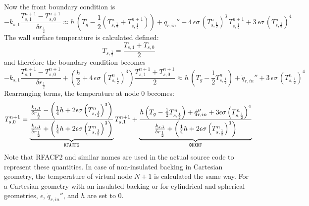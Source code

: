 Now the front boundary condition is
\begin{equation}
\label{bc_front_2}
  -k_{s,1} \frac{T_{s,1}^{n+1}-T_{s,0}^{n+1}}{\delta r_{\frac{1}{2}}}
  \approx h \, \left( T_g - \frac{1}{2} \left( T_{s,\frac{1}{2}}^n+T_{s,\frac{1}{2}}^{n+1} \right) \right) +
  \dot{q}_{r, in}'' - 4 \, \epsilon\sigma \, \left(T_{s,\frac{1}{2}}^n \right)^3 \, T_{s,\frac{1}{2}}^{n+1} + 3 \, \epsilon\sigma \, \left( T_{s,\frac{1}{2}}^n \right)^4
\end{equation}
The wall surface temperature is calculated defined:
\begin{equation}
\label{T_front}
  T_{s,\frac{1}{2}} = \frac{T_{s,1}+T_{s,0}}{2}
\end{equation}
and therefore the boundary condition becomes
\begin{equation}
\label{bc_front_4}
  -k_{s,1} \frac{T_{s,1}^{n+1}-T_{s,0}^{n+1}}{\delta r_{\frac{1}{2}}} + \left( \frac{h}{2} + 4 \, \epsilon\sigma \, \left( T_{s,\frac{1}{2}}^n \right)^3 \right) \frac{T_{s,1}^{n+1}+T_{s,0}^{n+1}}{2}
  \approx h\, \left( T_g - \frac{1}{2}T_{s,\frac{1}{2}}^n \right) +
  \dot{q}_{r, in}'' + 3 \, \epsilon\sigma \, \left( T_{s,\frac{1}{2}}^n \right)^4
\end{equation}
Rearranging terms, the temperature at node 0 becomes:
\begin{equation}
\label{T0}
  T_{s,0}^{n+1} = \underbrace{\frac{\frac{k_{s,1}}{\delta r_{\frac{1}{2}}}- \left(\frac{1}{4}h+2\epsilon \sigma \left(T_{s,\frac{1}{2}}^n\right)^3 \right)}{\frac{k_{s,1}}{\delta r_{\frac{1}{2}}} + \left(\frac{1}{4}h+2\epsilon \sigma \left( T_{s,\frac{1}{2}}^n\right)^3 \right)}}_{\tt\small RFACF2} T_{s,1}^{n+1} +
 \underbrace{\frac{h \left(T_g-\frac{1}{2}T_{s,\frac{1}{2}}^n\right)+\dot{q}_{r,in}''+3\epsilon \sigma \left( T_{s,\frac{1}{2}}^n\right)^4}{\frac{k_{s,1}}{\delta r_{\frac{1}{2}}}+\left(\frac{1}{4}h+2\epsilon \sigma \left( T_{s,\frac{1}{2}}^n\right)^3 \right)}}_{\tt\small QDXKF}
\end{equation}
Note that {\ct RFACF2} and similar names are used in the actual source code to represent these quantities.
In case of non-insulated backing in Cartesian geometry, the temperature of virtual node $N+1$ is calculated the same way.
For a Cartesian geometry with an insulated backing or for cylindrical and spherical geometries, $\epsilon$, $\dot{q}_{r,in}''$, and $h$ are set to 0.

